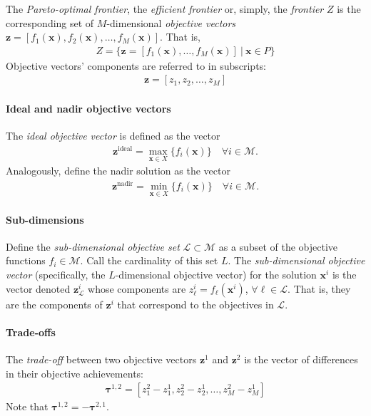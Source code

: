 The \textit{Pareto-optimal frontier}, the \textit{efficient frontier} or, simply, the \textit{frontier} $Z$ is the corresponding set of $M$-dimensional \textit{objective vectors} $\mathbf{z} = [f_1(\mathbf{x}),f_2(\mathbf{x}),\ldots,f_M(\mathbf{x})]$. That is,
\begin{align}
Z = \{\mathbf{z} = [f_1(\mathbf{x}),\ldots,f_M(\mathbf{x})] \:|\: \mathbf{x} \in P\}
\end{align}
Objective vectors' components are referred to in subscripts:
\begin{align}
\mathbf{z} = [z_1, z_2, \ldots, z_M]
\end{align}

\paragraph{Ideal and nadir objective vectors}
The \textit{ideal objective vector} is defined as the vector
\begin{align}
\mathbf{z}^{\text{ideal}} = \max_{\mathbf{x} \in X}\{f_i(\mathbf{x})\} \quad \forall i \in \mathcal{M}.
\end{align}
Analogously, define the nadir solution as the vector
\begin{align}
\mathbf{z}^{\text{nadir}} = \min_{\mathbf{x} \in X}\{f_i(\mathbf{x})\} \quad \forall i \in \mathcal{M}.
\end{align}


\paragraph{Sub-dimensions}
Define the \textit{sub-dimensional objective set} $\mathcal{L} \subset \mathcal{M}$ as a subset of the objective functions $f_i \in \mathcal{M}$. Call the cardinality of this set $L$. The \textit{sub-dimensional objective vector} (specifically, the $L$-dimensional objective vector) for the solution $\mathbf{x}^i$ is the vector denoted $\mathbf{z}^i_\mathcal{L}$ whose components are $z^i_\ell = f_\ell(\mathbf{x}^i)$, $\forall \ell \in \mathcal{L}$. That is, they are the components of $\mathbf{z}^i$ that correspond to the objectives in $\mathcal{L}$.

\paragraph{Trade-offs}
The \textit{trade-off} between two objective vectors $\mathbf{z}^1$ and $\mathbf{z}^2$ is the vector of differences in their objective achievements:
\begin{align}
\mathbf{\tau}^{1,2} = [z^2_1 - z^1_1, z^2_2 - z^1_2, \ldots, z^2_M - z^1_M]
\end{align}
Note that $\mathbf{\tau}^{1,2} = - \mathbf{\tau}^{2,1}$.

